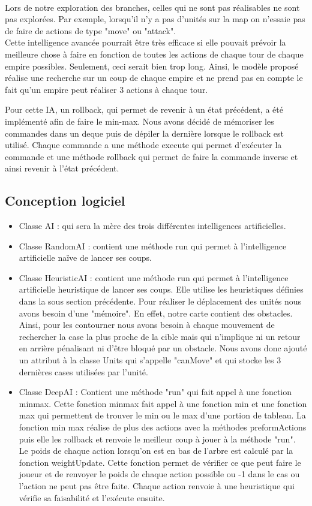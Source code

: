 \documentclass[12pt,a4paper]{article}
\begin{document}
\\Lors de notre exploration des branches, celles qui ne sont pas réalisables ne sont pas explorées. Par exemple, lorsqu'il n'y a pas d'unités sur la map on n'essaie pas de faire de actions de type "move" ou "attack".
\\Cette intelligence avancée pourrait être très efficace si elle pouvait prévoir la meilleure chose à faire en fonction de toutes les actions de chaque tour de chaque empire possibles. Seulement, ceci serait bien trop long. Ainsi, le modèle proposé réalise une recherche sur un coup de chaque empire et ne prend pas en compte le fait qu'un empire peut réaliser 3 actions à chaque tour. 

Pour cette IA, un rollback, qui permet de revenir à un état précédent, a été implémenté afin de faire le min-max. Nous avons décidé de mémoriser les commandes dans un deque puis de dépiler la dernière lorsque le rollback est utilisé. Chaque commande a une méthode execute qui permet d'exécuter la commande et une méthode rollback qui permet de faire la commande inverse et ainsi revenir à l'état précédent.

\subsection{Conception logiciel}
\begin{itemize}
    \item Classe AI : qui sera la mère des trois différentes intelligences artificielles.
    \item Classe RandomAI : contient une méthode run qui permet à l'intelligence artificielle naïve de lancer ses coups. 
    \item Classe HeuristicAI : contient une méthode run qui permet à l'intelligence artificielle heuristique de lancer ses coups. Elle utilise les heuristiques définies dans la sous section précédente. Pour réaliser le déplacement des unités nous avons besoin d'une "mémoire". En effet, notre carte contient des obstacles. Ainsi, pour les contourner nous avons besoin à chaque mouvement de rechercher la case la plus proche de la cible mais qui n'implique ni un retour en arrière pénalisant ni d'être bloqué par un obstacle. Nous avons donc ajouté un attribut à la classe Units qui s'appelle "canMove" et qui stocke les 3 dernières cases utilisées par l'unité.
    \item Classe DeepAI : Contient une méthode "run" qui fait appel à une fonction minmax. Cette fonction minmax fait appel à une fonction min et une fonction max qui permettent de trouver le min ou le max d'une portion de tableau. La fonction min max réalise de plus des actions avec la méthodes preformActions puis elle les rollback et renvoie le meilleur coup à jouer à la méthode "run". Le poids de chaque action lorsqu'on est en bas de l'arbre est calculé par la fonction weightUpdate. Cette fonction permet de vérifier ce que peut faire le joueur et de renvoyer le poids de chaque action possible ou -1 dans le cas ou l'action ne peut pas être faite. Chaque action renvoie à une heuristique qui vérifie sa faisabilité et l'exécute ensuite. 
\end{itemize}
\newpage
\end{document}
